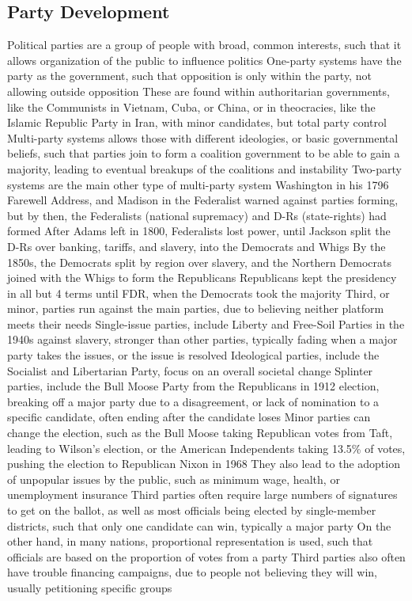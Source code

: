 \documentclass[11 pt, twoside]{article}
\newenvironment{outline*}
{
	\begin{outline}[enumerate]
	}
	{\end{outline}
}
\begin{document}
\subsection{Party Development}
\begin{outline*}
\1 Political parties are a group of people with broad, common interests, such that it allows organization of the public to influence politics
\1 One-party systems have the party as the government, such that opposition is only within the party, not allowing outside opposition
\2 These are found within authoritarian governments, like the Communists in Vietnam, Cuba, or China, or in theocracies, like the Islamic Republic Party in Iran, with minor candidates, but total party control
\1 Multi-party systems allows those with different ideologies, or basic governmental beliefs, such that parties join to form a coalition government to be able to gain a majority, leading to eventual breakups of the coalitions and instability
\2 Two-party systems are the main other type of multi-party system
\1 Washington in his 1796 Farewell Address, and Madison in the Federalist warned against parties forming, but by then, the Federalists (national supremacy) and D-Rs (state-rights) had formed
\2 After Adams left in 1800, Federalists lost power, until Jackson split the D-Rs over banking, tariffs, and slavery, into the Democrats and Whigs
\2 By the 1850s, the Democrats split by region over slavery, and the Northern Democrats joined with the Whigs to form the Republicans
\2 Republicans kept the presidency in all but 4 terms until FDR, when the Democrats took the majority
\1 Third, or minor, parties run against the main parties, due to believing neither platform meets their needs
\2 Single-issue parties, include Liberty and Free-Soil Parties in the 1940s against slavery, stronger than other parties, typically fading when a major party takes the issues, or the issue is resolved
\2 Ideological parties, include the Socialist and Libertarian Party, focus on an overall societal change
\2 Splinter parties, include the Bull Moose Party from the Republicans in 1912 election, breaking off a major party due to a disagreement, or lack of nomination to a specific candidate, often ending after the candidate loses
\1 Minor parties can change the election, such as the Bull Moose taking Republican votes from Taft, leading to Wilson’s election, or the American Independents taking 13.5\% of votes, pushing the election to Republican Nixon in 1968
\2 They also lead to the adoption of unpopular issues by the public, such as minimum wage, health, or unemployment insurance
\1 Third parties often require large numbers of signatures to get on the ballot, as well as most officials being elected by single-member districts, such that only one candidate can win, typically a major party
\2 On the other hand, in many nations, proportional representation is used, such that officials are based on the proportion of votes from a party
\2 Third parties also often have trouble financing campaigns, due to people not believing they will win, usually petitioning specific groups
\end{outline*}
\end{document}
